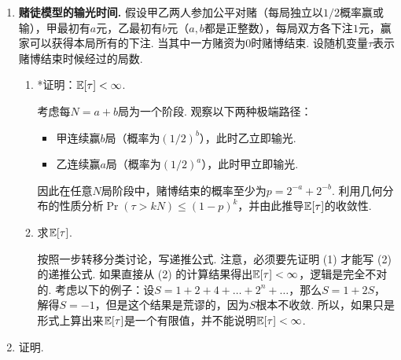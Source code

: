 \begin{enumerate}[wide, labelindent=0pt]
    \item \textbf{赌徒模型的输光时间. }假设甲乙两人参加公平对赌（每局独立以$1/2$概率赢或输），甲最初有$a$元，乙最初有$b$元（$a,b$都是正整数），每局双方各下注$1$元，赢家可以获得本局所有的下注. 当其中一方赌资为$0$时赌博结束. 设随机变量$\tau$表示赌博结束时候经过的局数.
    \begin{enumerate}
        \item *证明：$\mathbb{E}[\tau]<\infty$.
        \begin{hint}
            考虑每$N = a + b$局为一个阶段. 观察以下两种极端路径：
            \begin{itemize}
                \item 甲连续赢$b$局（概率为$(1/2)^b$），此时乙立即输光. 
                \item 乙连续赢$a$局（概率为$(1/2)^a$），此时甲立即输光. 
            \end{itemize}
            因此在任意$N$局阶段中，赌博结束的概率至少为$p = 2^{-a} + 2^{-b}$. 利用几何分布的性质分析$\Pr(\tau > kN) \leq (1 - p)^k$，并由此推导$\mathbb{E}[\tau]$的收敛性.
        \end{hint}    
        \item 求$\mathbb{E}[\tau]$.
        \begin{hint}
            按照一步转移分类讨论，写递推公式. 注意，必须要先证明 (1) 才能写 (2) 的递推公式. 如果直接从 (2) 的计算结果得出$\mathbb{E}[\tau] <\infty$，逻辑是完全不对的. 考虑以下的例子：设$S=1+2+4+\dots+2^n+\dots$，那么$S = 1 + 2S$，解得$S=-1$，但是这个结果是荒谬的，因为$S$根本不收敛. 所以，如果只是形式上算出来$\mathbb{E}[\tau]$是一个有限值，并不能说明$\mathbb{E}[\tau]<\infty$.
        \end{hint}
    \end{enumerate}

    \item \label{exercise:MDP-Bellman} 证明.


\end{enumerate}
